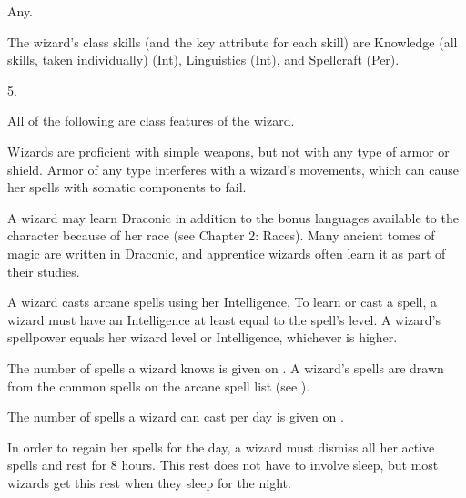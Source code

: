  Any.

The wizard's class skills (and the key attribute for each skill) are
Knowledge (all skills, taken individually) (Int), Linguistics (Int), and Spellcraft (Per).

5.


All of the following are class features of the wizard.

Wizards are proficient with simple weapons, but not with any type of armor or shield.
Armor of any type interferes with a wizard's movements, which can cause her spells with somatic components to fail.

A wizard may learn Draconic in addition to the bonus languages available to the character because of her race (see Chapter 2: Races).
Many ancient tomes of magic are written in Draconic, and apprentice wizards often learn it as part of their studies.

A wizard casts arcane spells using her Intelligence.
To learn or cast a spell, a wizard must have an Intelligence at least equal to the spell's level.
A wizard's spellpower equals her wizard level or Intelligence, whichever is higher.

The number of spells a wizard knows is given on .
A wizard's spells are drawn from the common spells on the arcane spell list (see ).

The number of spells a wizard can cast per day is given on .

In order to regain her spells for the day, a wizard must dismiss all her active spells and rest for 8 hours.
This rest does not have to involve sleep, but most wizards get this rest when they sleep for the night.


